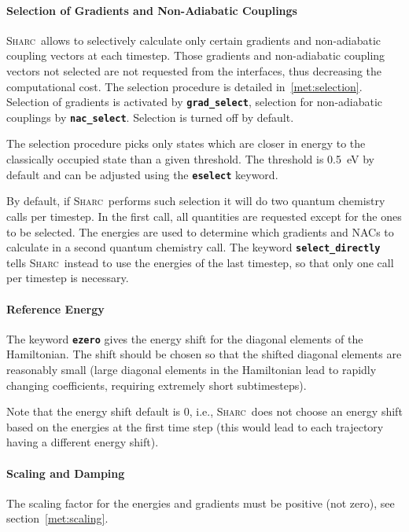 \documentclass[a4paper,11pt,DIV=15,openany,twoside=false]{scrbook}
\newcommand{\sharc}{\textsc{Sharc}}
\newcommand{\ttt}[1]{\textbf{\texttt{#1}}}
\begin{document}
\paragraph{Selection of Gradients and Non-Adiabatic Couplings}

\sharc\ allows to selectively calculate only certain gradients and non-adiabatic coupling vectors at each timestep. Those gradients and non-adiabatic coupling vectors not selected are not requested from the interfaces, thus decreasing the computational cost. The selection procedure is detailed in~\ref{met:selection}.
Selection of gradients is activated by \ttt{grad\_select}, selection for non-adiabatic couplings by \ttt{nac\_select}. Selection is turned off by default. 

The selection procedure picks only states which are closer in energy to the classically occupied state than a given threshold. The threshold is 0.5~eV by default and can be adjusted using the \ttt{eselect} keyword.

By default, if \sharc\ performs such selection it will do two quantum chemistry calls per timestep. In the first call, all quantities are requested except for the ones to be selected. The energies are used to determine which gradients and NACs to calculate in a second quantum chemistry call. The keyword \ttt{select\_directly} tells \sharc\ instead to use the energies of the last timestep, so that only one call per timestep is necessary.

\paragraph{Reference Energy}

The keyword \ttt{ezero} gives the energy shift for the diagonal elements of the Hamiltonian. The shift should be chosen so that the shifted diagonal elements are reasonably small (large diagonal elements in the Hamiltonian lead to rapidly changing coefficients, requiring extremely short subtimesteps). 

Note that the energy shift default is 0, i.e., \sharc\ does not choose an energy shift based on the energies at the first time step (this would lead to each trajectory having a different energy shift).

\paragraph{Scaling and Damping}

The scaling factor for the energies and gradients must be positive (not zero), see section~\ref{met:scaling}.
\end{document}
